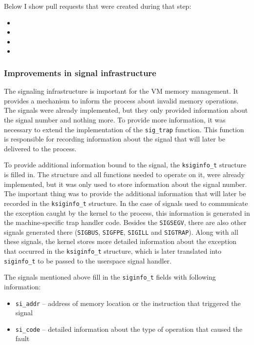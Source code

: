 \begin{samepage}
Below I show pull requests that were created during that step:
\begin{itemize}
  \item {}
  \item {}
  \item {}
  \item {}
\end{itemize}
\end{samepage}

\subsubsection{Improvements in signal infrastructure}

The signaling infrastructure is important for the VM memory management.
It provides a mechanism to inform the process about invalid memory operations.
The signals were already implemented, but they only provided information about the signal number and nothing more.
To provide more information, it was necessary to extend the implementation of the \texttt{sig_trap} function.
This function is responsible for recording information about the signal that will later be delivered to the process.

To provide additional information bound to the signal, the \texttt{ksiginfo_t} structure is filled in.
The structure and all functions needed to operate on it, were already implemented, but it was only used to store information about the signal number.
The important thing was to provide the additional information that will later be recorded in the \texttt{ksiginfo_t} structure.
In the case of signals used to communicate the exception caught by the kernel to the process, this information is generated in the machine-specific trap handler code.
Besides the {\tt SIGSEGV}, there are also other signals generated there ({\tt SIGBUS}, {\tt SIGFPE}, {\tt SIGILL} and {\tt SIGTRAP}).
Along with all these signals, the kernel stores more detailed information about the exception that occurred in the \texttt{ksiginfo_t} structure,
which is later translated into \texttt{siginfo_t} to be passed to the userspace signal handler.

The signals mentioned above fill in the \texttt{siginfo_t} fields with following information:
\begin{itemize}
  \item \texttt{si_addr} -- address of memory location or the instruction that triggered the signal
  \item \texttt{si_code} -- detailed information about the type of operation that caused the fault
\end{itemize}

